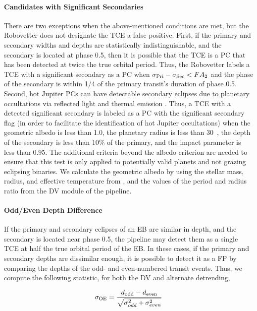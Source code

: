 \paragraph{Candidates with Significant Secondaries}
\label{s:sscand}
There are two exceptions when the above-mentioned conditions are met, but the Robovetter does not designate the TCE a false positive. First, if the primary and secondary widths and depths are statistically indistinguishable, and the secondary is located at phase 0.5, then it is possible that the TCE is a PC that has been detected at twice the true orbital period. Thus, the Robovetter labels a TCE with a significant secondary as a PC when ${\sigma_{\rm Pri} - \sigma_{\rm Sec} < FA_{2}}$ and the phase of the secondary is within 1/4 of the primary transit's duration of phase 0.5. Second, hot Jupiter PCs can have detectable secondary eclipses due to planetary occultations via reflected light and thermal emission \citep{Coughlin2012}. Thus, a TCE with a detected significant secondary is labeled as a PC with the significant secondary flag (in order to facilitate the identification of hot Jupiter occultations) when the geometric albedo is less than 1.0, the planetary radius is less than 30~\re{}, the depth of the secondary is less than 10\% of the primary, and the impact parameter is less than 0.95. The additional criteria beyond the albedo criterion are needed to ensure that this test is only applied to potentially valid planets and not grazing eclipsing binaries. We calculate the geometric albedo by using the stellar mass, radius, and effective temperature from \citet{Huber2014a}, and the values of the period and radius ratio from the DV module of the \kepler{} pipeline.



\paragraph{Odd/Even Depth Difference}

\label{s:oddeven}
If the primary and secondary eclipses of an EB are similar in depth, and the secondary is located near phase 0.5, the \kepler{} pipeline may detect them as a single TCE at half the true orbital period of the EB. In these cases, if the primary and secondary depths are dissimilar enough, it is possible to detect it as a FP by comparing the depths of the odd- and even-numbered transit events. Thus, we compute the following statistic, for both the DV and alternate detrending,

\begin{equation}
\sigma_{\rm OE} = \frac{d_{\rm odd} - d_{\rm even}}{\sqrt{\sigma_{odd}^{2} + \sigma_{even}^{2}}} 
\end{equation}

